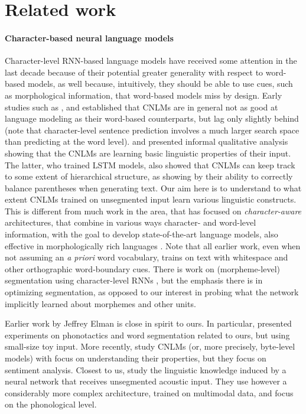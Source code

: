 \section{Related work}
\label{sec:related}

\paragraph{Character-based neural language models} Character-level
RNN-based language models have received some attention in the last
decade because of their potential greater generality with respect to
word-based models, as well because, intuitively, they should be able
to use cues, such as morphological information, that word-based models
miss by design. Early studies such as ,
 and  established
that CNLMs are in general not as good at language modeling as their
word-based counterparts, but lag only slightly behind (note that
character-level sentence prediction involves a much larger search
space than predicting at the word
level).  and 
presented informal qualitative analysis showing that the CNLMs are
learning basic linguistic properties of their input. The latter, who
trained LSTM models, also showed that CNLMs can keep track to some
extent of hierarchical structure, as showing by their ability to
correctly balance parentheses when generating text. Our aim here is to
understand to what extent CNLMs trained on unsegmented input learn
various linguistic constructs. This is different from much work in the
area, that has focused on \emph{character-aware} architectures, that
combine in various ways character- and word-level information, with
the goal to develop state-of-the-art language models, also effective
in morphologically rich languages \citep[see, e.g.,][and references
there]{Bojanowski:etal:2016,Kim:etal:2016,Gerz:etal:2018}. Note that
all earlier work, even when not assuming an \emph{a priori} word
vocabulary, trains on text with whitespace and other orthographic
word-boundary cues. There is work on (morpheme-level) segmentation
using character-level RNNs \cite{Kann:etal:2016}, but the emphasis
there is in optimizing segmentation, as opposed to our interest in
probing what the network implicitly learned about morphemes and other
units.


Earlier work by Jeffrey Elman is close in spirit to ours. In
particular,  presented experiments on phonotactics
and word segmentation related to ours, but using small-size toy
input. More recently, \cite{Radford:etal:2017} study CNLMs (or, more
precisely, byte-level models) with focus on understanding their
properties, but they focus on sentiment analysis. Closest to us,
\cite{Alishahi:etal:2017} study the linguistic knowledge induced by a
neural network that receives unsegmented acoustic input. They use
however a considerably more complex architecture, trained on
multimodal data, and focus on the phonological level.

